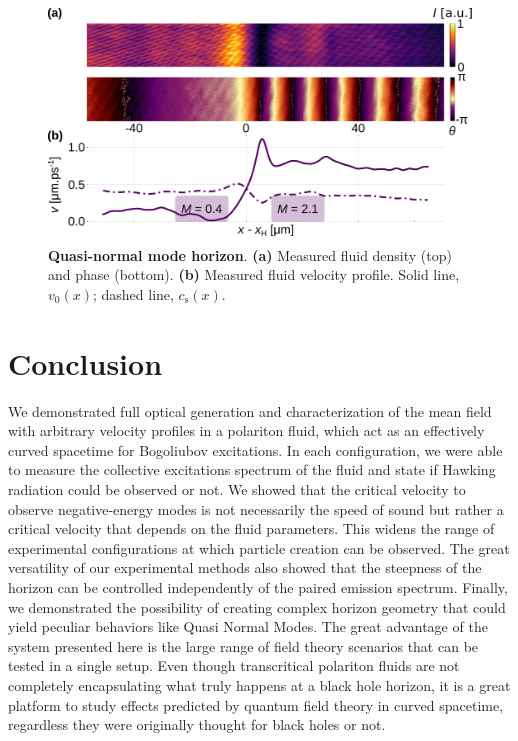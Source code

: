 \begin{figure}[h]
    \centering
    \includegraphics[width=1\textwidth]{chap_custom_st/fig/bh_qnm.pdf}
    \caption{\textbf{Quasi-normal mode horizon}.    
    \textbf{(a)} Measured fluid density (top) and phase (bottom).
    \textbf{(b)} Measured fluid velocity profile.
    Solid line, $v_0(x)$; dashed line, $c_\mathrm{s}(x)$.}
    \label{fig:bh_qnm}
\end{figure}
\clearpage
\section{Conclusion}

We demonstrated full optical generation and characterization of the mean field with arbitrary velocity profiles in a polariton fluid, which act as an effectively curved spacetime for 
Bogoliubov excitations. In each configuration, we were able to measure the collective excitations spectrum of the fluid and state if Hawking radiation could be observed or not. We showed that the critical velocity to observe negative-energy modes is not necessarily the speed of sound but rather a critical velocity 
that depends on the fluid parameters. This widens the range of experimental configurations at which particle creation can be observed. The great versatility of our experimental methods also showed that the steepness of the horizon can be controlled independently of the paired emission spectrum.
Finally, we demonstrated the possibility of creating complex horizon geometry that could yield peculiar behaviors like Quasi Normal Modes. The great 
advantage of the system presented here is the large range of field theory scenarios that can be tested in a single setup. Even though
 transcritical polariton fluids are not completely encapsulating what truly happens at a black hole horizon, it is a great platform to study effects predicted by quantum field theory in curved spacetime, regardless they were
originally thought for black holes or not.


